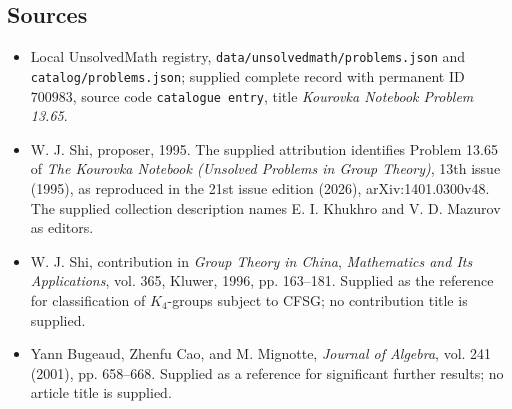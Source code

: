 \documentclass[11pt]{article}
\begin{document}
\subsection{Sources}
\begin{itemize}
\item Local UnsolvedMath registry, \texttt{data/unsolvedmath/problems.json} and \texttt{catalog/problems.json}; supplied complete record with permanent ID \(700983\), source code \texttt{catalogue entry}, title \emph{Kourovka Notebook Problem 13.65}.
\item W. J. Shi, proposer, 1995. The supplied attribution identifies Problem 13.65 of \emph{The Kourovka Notebook (Unsolved Problems in Group Theory)}, 13th issue (1995), as reproduced in the 21st issue edition (2026), arXiv:1401.0300v48. The supplied collection description names E. I. Khukhro and V. D. Mazurov as editors.
\item W. J. Shi, contribution in \emph{Group Theory in China}, \emph{Mathematics and Its Applications}, vol. 365, Kluwer, 1996, pp. 163--181. Supplied as the reference for classification of \(K_4\)-groups subject to CFSG; no contribution title is supplied.
\item Yann Bugeaud, Zhenfu Cao, and M. Mignotte, \emph{Journal of Algebra}, vol. 241 (2001), pp. 658--668. Supplied as a reference for significant further results; no article title is supplied.
\end{itemize}
\end{document}
